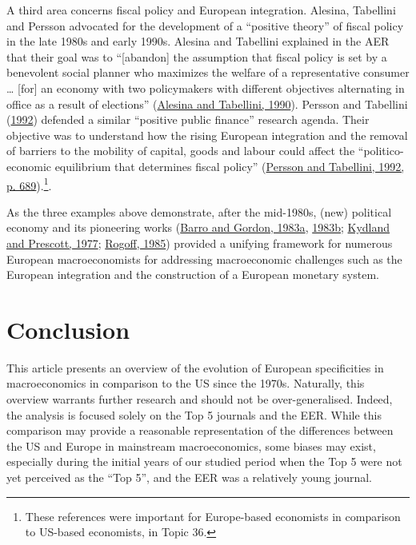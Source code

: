 \documentclass[
  12pt,
  onecolumn]{article}
\begin{document}
A third area concerns fiscal policy and European integration. Alesina, Tabellini and Persson advocated for the development of a ``positive theory'' of fiscal policy in the late 1980s and early 1990s. Alesina and Tabellini explained in the AER that their goal was to ``{[}abandon{]} the assumption that fiscal policy is set by a benevolent social planner who maximizes the welfare of a representative consumer \ldots{} {[}for{]} an economy with two policymakers with different objectives alternating in office as a result of elections'' (\protect\hyperlink{ref-alesina1990}{Alesina and Tabellini, 1990}). Persson and Tabellini (\protect\hyperlink{ref-persson1992}{1992}) defended a similar ``positive public finance'' research agenda. Their objective was to understand how the rising European integration and the removal of barriers to the mobility of capital, goods and labour could affect the ``politico-economic equilibrium that determines fiscal policy'' (\protect\hyperlink{ref-persson1992}{Persson and Tabellini, 1992, p. 689}).\footnote{These references were important for Europe-based economists in comparison to US-based economists, in Topic 36.}.

As the three examples above demonstrate, after the mid-1980s, (new) political economy and its pioneering works (\protect\hyperlink{ref-barro1983}{Barro and Gordon, 1983a}, \protect\hyperlink{ref-barro1983c}{1983b}; \protect\hyperlink{ref-kydland1977}{Kydland and Prescott, 1977}; \protect\hyperlink{ref-rogoff1985b}{Rogoff, 1985}) provided a unifying framework for numerous European macroeconomists for addressing macroeconomic challenges such as the European integration and the construction of a European monetary system.

\hypertarget{conclusion}{%
\section*{Conclusion}\label{conclusion}}

This article presents an overview of the evolution of European specificities in macroeconomics in comparison to the US since the 1970s. Naturally, this overview warrants further research and should not be over-generalised. Indeed, the analysis is focused solely on the Top 5 journals and the EER. While this comparison may provide a reasonable representation of the differences between the US and Europe in mainstream macroeconomics, some biases may exist, especially during the initial years of our studied period when the Top 5 were not yet perceived as the ``Top 5'', and the EER was a relatively young journal.
\end{document}
